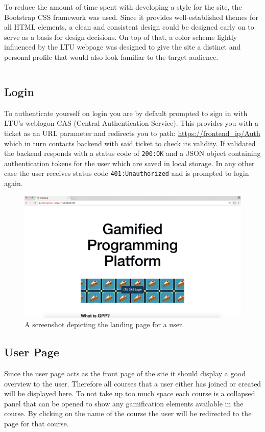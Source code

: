 To reduce the amount of time spent with developing a style for the site, the Bootstrap CSS framework was used. Since it provides well-established themes for all HTML elements, a clean and consistent design could be designed early on to serve as a basis for design decisions. On top of that, a color scheme lightly influenced by the LTU webpage was designed to give the site a distinct and personal profile that would also look familiar to the target audience.

\begin{figure}[hb]
    \centering
    \begin{tabular}{r|l}
        
    \end{tabular}
    \label{tab:components}
\end{figure}

\subsection{Login}
To authenticate yourself on login you are by default prompted to sign in with LTU's weblogon CAS (Central Authentication Service). 
This provides you with a ticket as an URL parameter and redirects you to path: \url{https://frontend\_ip/Auth} which in turn contacts backend with said ticket to check its validity. If validated the backend responds with a status code of \texttt{200:\@ OK} and a JSON object containing authentication tokens for the user which are saved in local storage. In any other case the user receives status code \texttt{401:\@ Unauthorized} and is prompted to login again.
\begin{figure}[H]
    \centering
    \includegraphics[width=.45\textwidth]{img/gppinpictures/login2.png}
    \caption{A screenshot depicting the landing page for a user.}
    \label{fig:student}
\end{figure}

\subsection{User Page}
Since the user page acts as the front page of the site it should display a good overview to the user. Therefore all courses that a user either has joined or created will be displayed here. To not take up too much space each course is a collapsed panel that can be opened to show any gamification elements available in the course. By clicking on the name of the course the user will be redirected to the page for that course.

